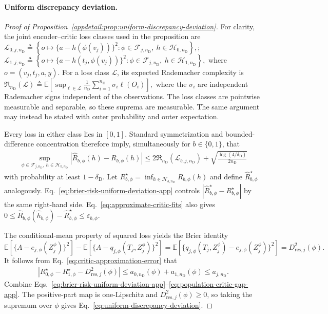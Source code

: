 \paragraph{Uniform discrepancy deviation.}
\begin{proof}[Proof of Proposition~\ref{appdetail:prop:uniform-discrepancy-deviation}]
For clarity, the joint encoder--critic loss classes used in the proposition are
\(\mathcal L_{0,j,n_{\mathrm D}} \triangleq \left\{ o\mapsto\{a-h(\phi(v_j))\}^2: \phi\in\mathcal F_{j,n_{\mathrm D}},\ h\in\mathcal H_{0,n_{\mathrm D}} \right\},\); \(\mathcal L_{1,j,n_{\mathrm D}} \triangleq \left\{ o\mapsto\{a-h(t_j,\phi(v_j))\}^2: \phi\in\mathcal F_{j,n_{\mathrm D}},\ h\in\mathcal H_{1,n_{\mathrm D}} \right\},\)
where $o=(v_j,t_j,a,y)$. For a loss class $\mathcal L$, its expected Rademacher complexity is
\(\mathfrak R_{n_{\mathrm D}}(\mathcal L) \triangleq \mathbb E\!\left[ \sup_{\ell\in\mathcal L} \frac1{n_{\mathrm D}}\sum_{i=1}^{n_{\mathrm D}}\sigma_i\ell(O_i) \right],\)
where the $\sigma_i$ are independent Rademacher signs independent of the observations. The loss classes are pointwise measurable and separable, so these suprema are measurable.
The same argument may instead be stated with outer probability and outer expectation.

Every loss in either class lies in $[0,1]$. Standard symmetrization and bounded-difference concentration therefore imply, simultaneously for $b\in\{0,1\}$, that
\begin{align}
\sup_{\phi\in\mathcal F_{j,n_{\mathrm D}},\,h\in\mathcal H_{b,n_{\mathrm D}}}
|\widehat R_{b,\phi}(h)-R_{b,\phi}(h)|
\le
2\mathfrak R_{n_{\mathrm D}}(\mathcal L_{b,j,n_{\mathrm D}})
+\sqrt{\frac{\log(4/\delta_{\mathrm D})}{2n_{\mathrm D}}}
\label{eq:brier-risk-uniform-deviation-app}
\end{align}
with probability at least $1-\delta_{\mathrm D}$. Let $R_{b,\phi}^{\star}=\inf_{h\in\mathcal H_{b,n_{\mathrm D}}}R_{b,\phi}(h)$ and define $\widehat R_{b,\phi}^{\star}$ analogously. Eq.~\eqref{eq:brier-risk-uniform-deviation-app} controls $|\widehat R_{b,\phi}^{\star}-R_{b,\phi}^{\star}|$ by the same right-hand side. Eq.~\eqref{eq:approximate-critic-fits} also gives
\(0 \le \widehat R_{b,\phi}(\widehat h_{b,\phi}) -\widehat R_{b,\phi}^{\star} \le \varepsilon_{b,\phi}.\)

The conditional-mean property of squared loss yields the Brier identity
\(\mathbb E[\{A-e_{j,\phi}(Z_j^\phi)\}^2] -\mathbb E[\{A-q_{j,\phi}(T_j,Z_j^\phi)\}^2] = \mathbb E[\{q_{j,\phi}(T_j,Z_j^\phi)-e_{j,\phi}(Z_j^\phi)\}^2] =D_{\mathrm{res},j}^2(\phi).\)
It follows from Eq.~\eqref{eq:critic-approximation-error} that
\begin{align}
\left|
R_{0,\phi}^{\star}-R_{1,\phi}^{\star}
-D_{\mathrm{res},j}^2(\phi)
\right|
\le
a_{0,n_{\mathrm D}}(\phi)+a_{1,n_{\mathrm D}}(\phi)
\le a_{j,n_{\mathrm D}}.
\label{eq:population-critic-gap-app}
\end{align}
Combine Eqs.~\eqref{eq:brier-risk-uniform-deviation-app}--\eqref{eq:population-critic-gap-app}. The positive-part map is one-Lipschitz and $D_{\mathrm{res},j}^2(\phi)\ge0$, so taking the supremum over $\phi$ gives Eq.~\eqref{eq:uniform-discrepancy-deviation}.
\end{proof}

